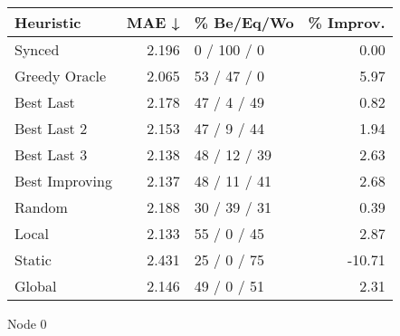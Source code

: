 \begin{tabular}{lrlr}
\toprule
\textbf{Heuristic} & \textbf{MAE ↓} & \textbf{\% Be/Eq/Wo} & \textbf{\% Improv.} \\
\midrule
            Synced &          2.196 &          0 / 100 / 0 &                0.00 \\
     Greedy Oracle &          2.065 &          53 / 47 / 0 &                5.97 \\
         Best Last &          2.178 &          47 / 4 / 49 &                0.82 \\
       Best Last 2 &          2.153 &          47 / 9 / 44 &                1.94 \\
       Best Last 3 &          2.138 &         48 / 12 / 39 &                2.63 \\
    Best Improving &          2.137 &         48 / 11 / 41 &                2.68 \\
            Random &          2.188 &         30 / 39 / 31 &                0.39 \\
             Local &          2.133 &          55 / 0 / 45 &                2.87 \\
            Static &          2.431 &          25 / 0 / 75 &              -10.71 \\
            Global &          2.146 &          49 / 0 / 51 &                2.31 \\
\bottomrule
\end{tabular}
\caption{Node 0}
\label{tab:ds_iid_lr05_le2_bs2_0}
